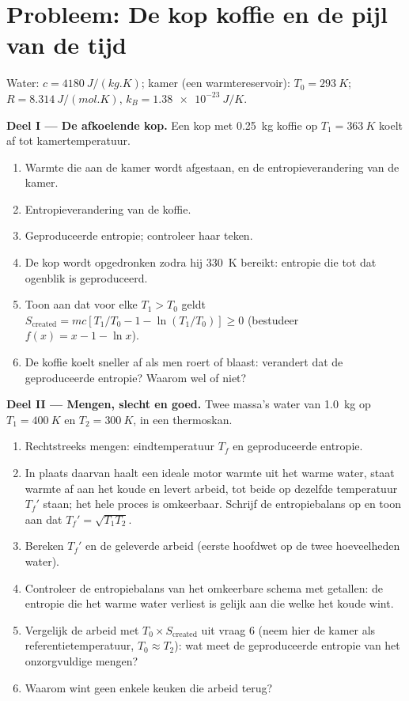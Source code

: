 \section{Probleem: De kop koffie en de pijl van de tijd}

\begin{problem}
\label{pb:b1:second-law-entropy:1}
Water: $c = \qty{4180}{J/(kg.K)}$; kamer (een warmtereservoir): $T_0 = \qty{293}{K}$;
$R = \qty{8.314}{J/(mol.K)}$, $k_B = \qty{1.38e-23}{J/K}$.

\medskip
\noindent\textbf{Deel I --- De afkoelende kop.}
Een kop met \qty{0.25}{kg} koffie op $T_1 = \qty{363}{K}$ koelt af tot
kamertemperatuur.
\begin{enumerate}
  \item Warmte die aan de kamer wordt afgestaan, en de entropieverandering van de kamer.
  \item Entropieverandering van de koffie.
  \item Geproduceerde entropie; controleer haar teken.
  \item De kop wordt opgedronken zodra hij \qty{330}{K} bereikt: entropie die tot
        dat ogenblik is geproduceerd.
  \item Toon aan dat voor elke $T_1 > T_0$ geldt $S_{\mathrm{created}} = mc[T_1/T_0 - 1 -
        \ln(T_1/T_0)] \geq 0$ (bestudeer $f(x) = x - 1 - \ln x$).
  \item De koffie koelt sneller af als men roert of blaast: verandert dat
        de geproduceerde entropie? Waarom wel of niet?
\end{enumerate}

\medskip
\noindent\textbf{Deel II --- Mengen, slecht en goed.}
Twee massa's water van \qty{1.0}{kg} op $T_1 = \qty{400}{K}$ en $T_2 =
\qty{300}{K}$, in een thermoskan.
\begin{enumerate}[resume]
  \item Rechtstreeks mengen: eindtemperatuur $T_f$ en geproduceerde entropie.
  \item In plaats daarvan haalt een ideale motor warmte uit het warme water, staat
        warmte af aan het koude en levert arbeid, tot beide op dezelfde
        temperatuur $T_f'$ staan; het hele proces is omkeerbaar. Schrijf de
        entropiebalans op en toon aan dat $T_f' = \sqrt{T_1T_2}$.
  \item Bereken $T_f'$ en de geleverde arbeid (eerste hoofdwet op de twee
        hoeveelheden water).
  \item Controleer de entropiebalans van het omkeerbare schema met getallen: de
        entropie die het warme water verliest is gelijk aan die welke het koude wint.
  \item Vergelijk de arbeid met $T_0 \times S_{\mathrm{created}}$ uit vraag 6
        (neem hier de kamer als referentietemperatuur, $T_0 \approx T_2$):
        wat meet de geproduceerde entropie van het onzorgvuldige mengen?
  \item Waarom wint geen enkele keuken die arbeid terug?
\end{enumerate}


\end{problem}
